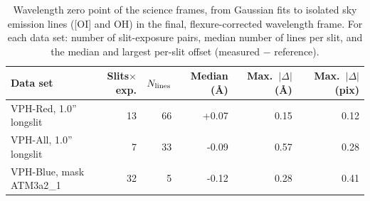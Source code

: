 \begin{table}[t]
  \centering\small
  \caption{Wavelength zero point of the science frames, from Gaussian fits to
    isolated sky emission lines ([OI] and OH) in the final, flexure-corrected
    wavelength frame. For each data set: number of slit-exposure pairs, median
    number of lines per slit, and the median and largest per-slit offset
    (measured $-$ reference).}
  \label{tab:skylines}
  \begin{tabular}{lrrrrr}
    \toprule
    Data set & Slits$\times$exp. & $N_{\rm lines}$ & Median (\AA) & Max.\ $|\Delta|$ (\AA) & Max.\ $|\Delta|$ (pix) \\
    \midrule
    VPH-Red, 1.0'' longslit & 13 & 66 & +0.07 & 0.15 & 0.12 \\
    VPH-All, 1.0'' longslit & 7 & 33 & -0.09 & 0.57 & 0.28 \\
    VPH-Blue, mask ATM3a2\_1 & 32 & 5 & -0.12 & 0.28 & 0.41 \\
    \bottomrule
  \end{tabular}
\end{table}
